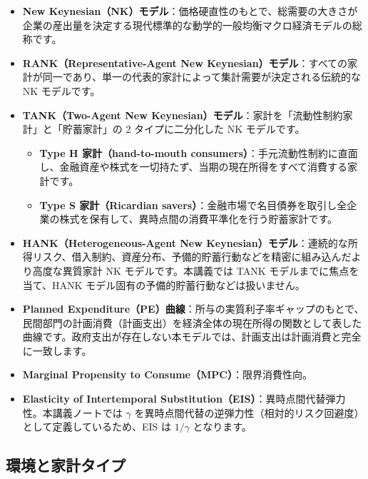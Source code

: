 \documentclass[
  japanese,
  lualatex,
  ja=standard,
  12pt,
  a4paper]{ltjsarticle}
\providecommand{\tightlist}{%
  \setlength{\itemsep}{0pt}\setlength{\parskip}{0pt}}
\begin{document}
\begin{itemize}
\tightlist
\item
  \textbf{New
  Keynesian（NK）モデル}：価格硬直性のもとで、総需要の大きさが企業の産出量を決定する現代標準的な動学的一般均衡マクロ経済モデルの総称です。
\item
  \textbf{RANK（Representative-Agent New
  Keynesian）モデル}：すべての家計が同一であり、単一の代表的家計によって集計需要が決定される伝統的な
  NK モデルです。
\item
  \textbf{TANK（Two-Agent New
  Keynesian）モデル}：家計を「流動性制約家計」と「貯蓄家計」の 2
  タイプに二分化した NK モデルです。

  \begin{itemize}
  \tightlist
  \item
    \textbf{Type H 家計（hand-to-mouth
    consumers）}：手元流動性制約に直面し、金融資産や株式を一切持たず、当期の現在所得をすべて消費する家計です。
  \item
    \textbf{Type S 家計（Ricardian
    savers）}：金融市場で名目債券を取引し全企業の株式を保有して、異時点間の消費平準化を行う貯蓄家計です。
  \end{itemize}
\item
  \textbf{HANK（Heterogeneous-Agent New
  Keynesian）モデル}：連続的な所得リスク、借入制約、資産分布、予備的貯蓄行動などを精密に組み込んだより高度な異質家計
  NK モデルです。本講義では TANK モデルまでに焦点を当て、HANK
  モデル固有の予備的貯蓄行動などは扱いません。
\item
  \textbf{Planned
  Expenditure（PE）曲線}：所与の実質利子率ギャップのもとで、民間部門の計画消費（計画支出）を経済全体の現在所得の関数として表した曲線です。政府支出が存在しない本モデルでは、計画支出は計画消費と完全に一致します。
\item
  \textbf{Marginal Propensity to Consume（MPC）}：限界消費性向。
\item
  \textbf{Elasticity of Intertemporal
  Substitution（EIS）}：異時点間代替弾力性。本講義ノートでは \(\gamma\)
  を異時点間代替の逆弾力性（相対的リスク回避度）として定義しているため、EIS
  は \(1/\gamma\) となります。
\end{itemize}


\subsection{環境と家計タイプ}\label{ux74b0ux5883ux3068ux5bb6ux8a08ux30bfux30a4ux30d7}
\end{document}
